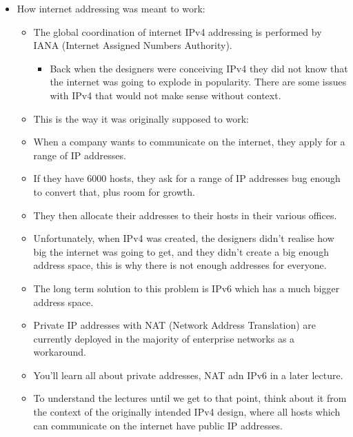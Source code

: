 \begin{itemize}
    \item How internet addressing was meant to work:
        \begin{itemize}
            \item The global coordination of internet IPv4 addressing is performed by IANA (Internet Assigned Numbers Authority).
                \begin{itemize}
                    \item Back when the designers were conceiving IPv4 they did not know that the internet was going to explode in popularity. There are some issues with IPv4 that would not make sense without context.
                \end{itemize}
            \item This is the way it was originally supposed to work:
            \item When a company wants to communicate on the internet, they apply for a range of IP addresses.
            \item If they have 6000 hosts, they ask for a range of IP addresses bug enough to convert that, plus room for growth.
            \item They then allocate their addresses to their hosts in their various offices.
            \item Unfortunately, when IPv4 was created, the designers didn't realise how big the internet was going to get, and they didn't create a big enough address space, this is why there is not enough addresses for everyone.
            \item The long term solution to this problem is IPv6 which has a much bigger address space.
            \item Private IP addresses with NAT (Network Address Translation) are currently deployed in the majority of enterprise networks as a workaround.
            \item You'll learn all about private addresses, NAT adn IPv6 in a later lecture.
            \item To understand the lectures until we get to that point, think about it from the context of the originally intended IPv4 design, where all hosts which can communicate on the internet have public IP addresses.
        \end{itemize}
    

\end{itemize}
